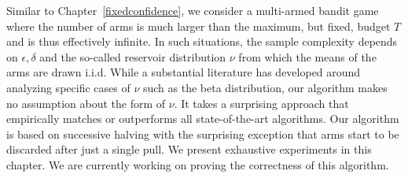 Similar to Chapter~\ref{fixedconfidence}, we consider a multi-armed bandit game where the number of arms is much larger than the maximum, but fixed, budget $T$ and is thus effectively infinite.
In such situations, the sample complexity depends on $\epsilon, \delta$ and the so-called reservoir distribution $\nu$ from which the means of the arms are drawn i.i.d. 
While a substantial literature has developed around analyzing specific cases of $\nu$ such as the beta distribution, our algorithm makes no assumption about the form of $\nu$. It takes a surprising approach that empirically matches or outperforms all state-of-the-art algorithms. 
Our algorithm is based on successive halving with the surprising exception that arms start to be discarded after just a single pull. We present exhaustive experiments in this chapter. We are currently working on proving the correctness of this algorithm.





\clearpage

\clearpage

%

